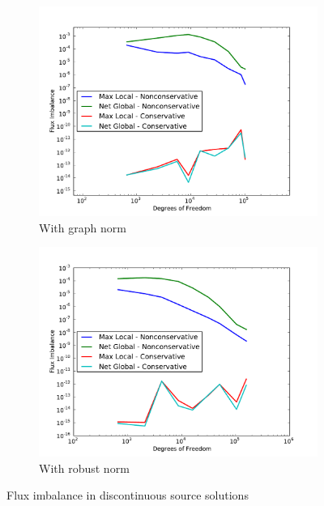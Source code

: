 \documentclass[letterpaper]{article}
\begin{document}
\begin{figure}
\centering
\begin{subfigure}[t]{0.45\textwidth}
\centering
\includegraphics[width=\textwidth]{figs/Discontinuous/graphFlux.pdf}
\caption{With graph norm}
\label{fig:discontinuousGraphFlux}
\end{subfigure}
\begin{subfigure}[t]{0.45\textwidth}
\centering
\includegraphics[width=\textwidth]{figs/Discontinuous/robustFlux.pdf}
\caption{With robust norm}
\label{fig:discontinuousRobustFlux}
\end{subfigure}
\caption{Flux imbalance in discontinuous source solutions}
\label{fig:discontinuous_flux}
\end{figure}
\end{document}
